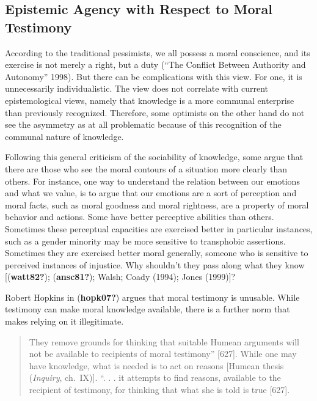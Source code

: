 \documentclass[12pt]{book}
\theoremstyle{definition}
\theoremstyle{remark}
\begin{document}
\subsection*{Epistemic Agency with Respect to Moral Testimony}\label{epistemic-agency-with-respect-to-moral-testimony}

According to the traditional pessimists, we all possess a moral conscience, and its exercise is not merely a right, but a duty ({``The {Conflict Between Authority} and {Autonomy}''} 1998). But there can be complications with this view. For one, it is unnecessarily individualistic. The view does not correlate with current epistemological views, namely that knowledge is a more communal enterprise than previously recognized. Therefore, some optimists on the other hand do not see the asymmetry as at all problematic because of this recognition of the communal nature of knowledge.

Following this general criticism of the sociability of knowledge, some argue that there are those who see the moral contours of a situation more clearly than others. For instance, one way to understand the relation between our emotions and what we value, is to argue that our emotions are a sort of perception and moral facts, such as moral goodness and moral rightness, are a property of moral behavior and actions. Some have better perceptive abilities than others. Sometimes these perceptual capacities are exercised better in particular instances, such as a gender minority may be more sensitive to transphobic assertions. Sometimes they are exercised better moral generally, someone who is sensitive to perceived instances of injustice. Why shouldn't they pass along what they know {[}(\textbf{watt82?}); (\textbf{ansc81?}); Walsh; Coady (1994); Jones (1999){]}?

Robert Hopkins in (\textbf{hopk07?}) argues that moral testimony is unusable. While testimony can make moral knowledge available, there is a further norm that makes relying on it illegitimate.

\begin{quote}
They remove grounds for thinking that suitable Humean arguments will not be available to recipients of moral testimony'' {[}627{]}. While one may have knowledge, what is needed is to act on reasons {[}Humean thesis (\emph{Inquiry}, ch.~IX){]}. ``. . . it attempts to find reasons, available to the recipient of testimony, for thinking that what she is told is true {[}627{]}.
\end{quote}
\end{document}

